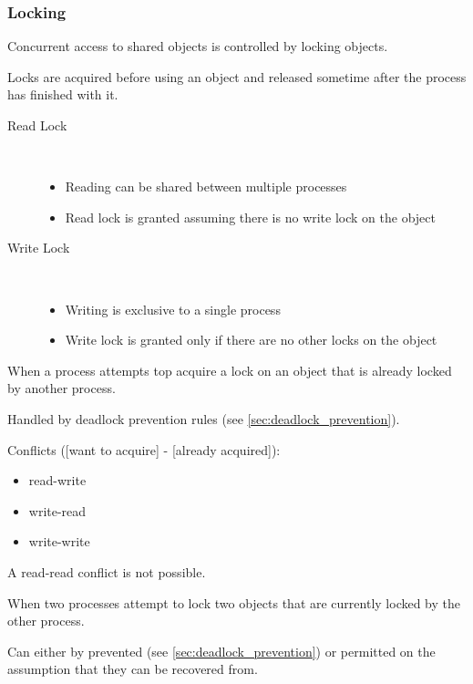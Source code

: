 \documentclass[a4paper]{article}
\begin{document}
\subsubsection{Locking}

Concurrent access to shared objects is controlled by locking objects.

Locks are acquired before using an object and released sometime after the
process has finished with it.

\begin{description}
  \item[Read Lock] \hfill \\
    \begin{itemize}
      \item Reading can be shared between multiple processes
      \item Read lock is granted assuming there is no write lock on the object
    \end{itemize}

  \item[Write Lock] \hfill \\
    \begin{itemize}
      \item Writing is exclusive to a single process
      \item Write lock is granted only if there are no other locks on the object
    \end{itemize}
\end{description}


When a process attempts top acquire a lock on an object that is already locked
by another process.

Handled by deadlock prevention rules (see \ref{sec:deadlock_prevention}).

Conflicts ([want to acquire] - [already acquired]):

\begin{itemize}
  \item read-write
  \item write-read
  \item write-write
\end{itemize}

A read-read conflict is not possible.


When two processes attempt to lock two objects that are currently locked by the
other process.

Can either by prevented (see \ref{sec:deadlock_prevention}) or permitted on the
assumption that they can be recovered from.
\end{document}
